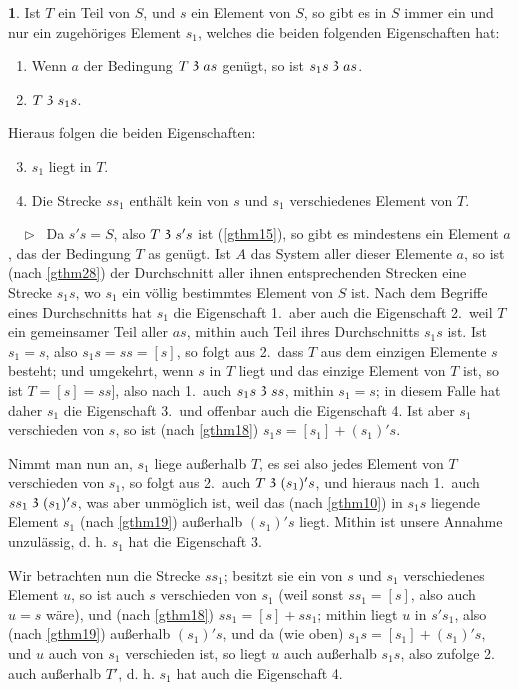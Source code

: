 \documentclass[leqno,hidelinks]{article}
\theoremstyle{definition}
\newtheorem{satz}{\protect\satzname}
\newcommand{\satzname}{}
\renewcommand{\satzname}{\hspace{-4pt}.\ Satz}%
\renewcommand{\satzname}{\hspace{-4pt}.\ Theorem}%
\newcommand\beweis{ $ \phantom{'.'} \rhd \ $}%
\newcommand\TeilVon{\mathrel{\raisebox{0.45ex}{$\mathfrak{3}$}}}
\newcommand{\sref}[1]{\underline{\ref{#1}}}%
\begin{document}
\begin{paracol}{2}
\begin{satz}\label{gthm29}
Ist $T$ ein Teil von $S$, und $s$ ein Element von $S$, so gibt es in $S$ immer ein
und nur ein zugehöriges Element $s_1$, welches die beiden folgenden Eigenschaften hat:
\begin{enumerate} \setcounter{enumi}{0} \setlength\itemsep{-0.25em}
   \item  Wenn $a$ der Bedingung $T \TeilVon as$ genügt, so ist $s_1s \TeilVon as$.
   \item $T \TeilVon s_1s$.
\end{enumerate}
Hieraus folgen die beiden Eigenschaften:
\begin{enumerate} \setcounter{enumi}{2} \setlength\itemsep{-0.25em}
    \item $s_1$ liegt in $T$.
    \item Die Strecke $ss_1$ enthält kein von $s$ und $s_1$ verschiedenes Element von $T$.
\end{enumerate}
\beweis
Da $s's = S$, also $T \TeilVon s's$ ist (\sref{gthm15}), so gibt es mindestens
ein Element $a$, das der Bedingung $T$ as genügt. Ist $A$ das System aller dieser
Elemente $a$, so ist (nach \sref{gthm28}) der Durchschnitt aller ihnen entsprechenden
Strecken eine Strecke $s_1s$, wo $s_1$ ein völlig bestimmtes Element von $S$ ist.
Nach dem Begriffe eines Durchschnitts hat $s_1$ die Eigenschaft 1.\, aber auch die
Eigenschaft 2.\, weil $T$ ein gemeinsamer Teil aller $as$, mithin auch Teil ihres
Durchschnitts $s_1s$ ist. Ist $s_1 = s$, also $s_1s = ss = [s]$, so folgt aus 2.\,
dass $T$ aus dem einzigen Elemente $s$ besteht; und umgekehrt, wenn $s$ in $T$
liegt und das einzige Element von $T$ ist, so ist $T = [s] = ss]$, also nach 1.\
auch $s_1s \TeilVon ss$, mithin $s_1 = s$; in diesem Falle hat daher $s_1$ die
Eigenschaft 3.\ und offenbar auch die Eigenschaft 4. Ist aber $s_1$ verschieden
von $s$, so ist (nach \sref{gthm18}) $s_1s = [s_1] + (s_1)'s$.

Nimmt man nun an, $s_1$ liege außerhalb $T$, es sei also jedes Element von $T$
verschieden von $s_1$, so folgt aus 2.\ auch $T \TeilVon (s_1)'s$, und hieraus
nach 1.\ auch $ss_1 \TeilVon (s_1)'s$, was aber unmöglich ist, weil das (nach
\sref{gthm10}) in $s_1s$ liegende Element $s_1$ (nach \sref{gthm19}) außerhalb
$(s_1)'s$ liegt. Mithin ist unsere Annahme unzulässig, d. h.  $s_1$  hat die
Eigenschaft 3.

Wir betrachten nun die Strecke $ss_1$; besitzt sie ein von $s$ und $s_1$
verschiedenes Element $u$, so ist auch $s$ verschieden von $s_1$ (weil sonst
$ss_1 = [s]$, also auch $u = s$ wäre), und (nach \sref{gthm18}) $ss_1 = [s] + ss_1$;
mithin liegt $u$ in $s's_1$, also (nach \sref{gthm19}) außerhalb $(s_1)'s$, und
da (wie oben) $s_1s = [s_1] + (s_1)'s$, und $u$ auch von $s_1$ verschieden ist, so
liegt $u$ auch außerhalb  $s_1s$, also zufolge 2. auch außerhalb $T'$, d. h. $s_1$
hat auch die Eigenschaft 4.
\end{satz}


\end{paracol}
\end{document}
